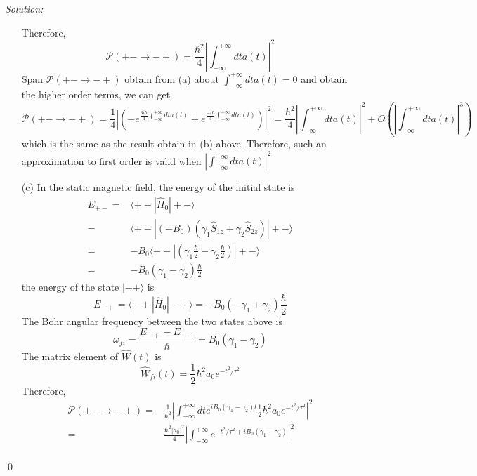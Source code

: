 \documentclass[10pt,a4paper]{article}
\newenvironment{sol}
    {\emph{Solution:}
    }
    {
    \qed
    }
\begin{document}
\begin{sol}
\begin{itemize}
Therefore,
\begin{equation}
\mathscr{P}(+-\rightarrow-+)=\frac{\hbar^2}{4}\left|\int_{-\infty}^{+\infty}dta(t)\right|^2
\end{equation}
Span $\mathscr{P}(+-\rightarrow-+)$ obtain from (a) about $\int_{-\infty}^{+\infty}dta(t)=0$ and obtain the higher order terms, we can get
\begin{equation}
\mathscr{P}(+-\rightarrow-+)=\frac{1}{4}\left|(-e^{\frac{3i\hbar}{4}\int_{-\infty}^{+\infty}dta(t)}+e^{\frac{-i\hbar}{4}\int_{-\infty}^{+\infty}dta(t)})\right|^2=\frac{\hbar^2}{4}\left|\int_{-\infty}^{+\infty}dta(t)\right|^2+O\left(\left|\int_{-\infty}^{+\infty}dta(t)\right|^3\right)
\end{equation}
which is the same as the result obtain in (b) above. Therefore, such an approximation to first order is valid when $\left|\int_{-\infty}^{+\infty}dta(t)\right|^2$
\item[(c)] In the static magnetic field, the energy of the initial state is
\begin{align}
\nonumber E_{+-}=&\langle+-|\hat{H}_0|+-\rangle\\
\nonumber=&\langle+-|(-B_0)(\gamma_1\hat{S}_{1z}+\gamma_2\hat{S}_{2z})|+-\rangle\\
\nonumber=&-B_0\langle+-|(\gamma_1\frac{\hbar}{2}-\gamma_2\frac{\hbar}{2})|+-\rangle\\
=&-B_0(\gamma_1-\gamma_2)\frac{\hbar}{2}
\end{align}
the energy of the state $|-+\rangle$ is
\begin{equation}
\nonumber E_{-+}=\langle-+|\hat{H}_0|-+\rangle=-B_0(-\gamma_1+\gamma_2)\frac{\hbar}{2}
\end{equation}
The Bohr angular frequency between the two states above is
\begin{equation}
\omega_{fi}=\frac{E_{-+}-E_{+-}}{\hbar}=B_0(\gamma_1-\gamma_2)
\end{equation}
The matrix element of $\hat{W}(t)$ is
\begin{equation}
\hat{W}_{fi}(t)=\frac{1}{2}\hbar^2a_0e^{-t^2/\tau^2}
\end{equation}
Therefore,
\begin{align}
\nonumber\mathscr{P}(+-\rightarrow-+)=&\frac{1}{\hbar^2}\left|\int_{-\infty}^{+\infty}dte^{iB_0(\gamma_1-\gamma_2)t}\frac{1}{2}\hbar^2a_0e^{-t^2/\tau^2}\right|^2\\
\nonumber=&\frac{\hbar^2|a_0|^2}{4}\left|\int_{-\infty}^{+\infty}e^{-t^2/\tau^2+iB_0(\gamma_1-\gamma_2)}\right|^2\\

\end{align}
\end{itemize}
\end{sol}
\end{document}
